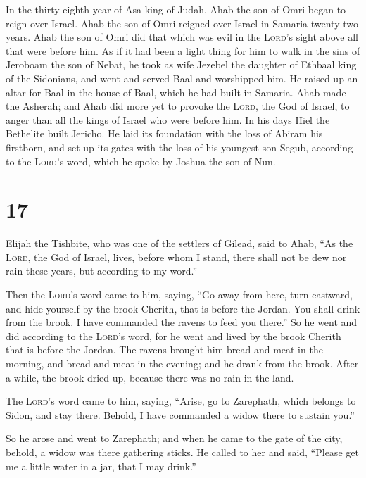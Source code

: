  In the thirty-eighth year of Asa king of Judah, Ahab the
son of Omri began to reign over Israel. Ahab the son of Omri reigned
over Israel in Samaria twenty-two years.  Ahab the son of
Omri did that which was evil in the \textsc{Lord}'s sight above all that
were before him.  As if it had been a light thing for him
to walk in the sins of Jeroboam the son of Nebat, he took as wife
Jezebel the daughter of Ethbaal king of the Sidonians, and went and
served Baal and worshipped him.  He raised up an altar
for Baal in the house of Baal, which he had built in Samaria.
 Ahab made the Asherah; and Ahab did more yet to provoke
the \textsc{Lord}, the God of Israel, to anger than all the kings of
Israel who were before him.  In his days Hiel the
Bethelite built Jericho. He laid its foundation with the loss of Abiram
his firstborn, and set up its gates with the loss of his youngest son
Segub, according to the \textsc{Lord}'s word, which he spoke by Joshua
the son of Nun.

\hypertarget{section-16}{%
\section{17}\label{section-16}}

 Elijah the Tishbite, who was one of the settlers of
Gilead, said to Ahab, ``As the \textsc{Lord}, the God of Israel, lives,
before whom I stand, there shall not be dew nor rain these years, but
according to my word.''

 Then the \textsc{Lord}'s word came to him, saying,
 ``Go away from here, turn eastward, and hide yourself by
the brook Cherith, that is before the Jordan.  You shall
drink from the brook. I have commanded the ravens to feed you there.''
 So he went and did according to the \textsc{Lord}'s word,
for he went and lived by the brook Cherith that is before the Jordan.
 The ravens brought him bread and meat in the morning, and
bread and meat in the evening; and he drank from the brook.
 After a while, the brook dried up, because there was no
rain in the land.

 The \textsc{Lord}'s word came to him, saying,
 ``Arise, go to Zarephath, which belongs to Sidon, and
stay there. Behold, I have commanded a widow there to sustain you.''

 So he arose and went to Zarephath; and when he came to
the gate of the city, behold, a widow was there gathering sticks. He
called to her and said, ``Please get me a little water in a jar, that I
may drink.''

